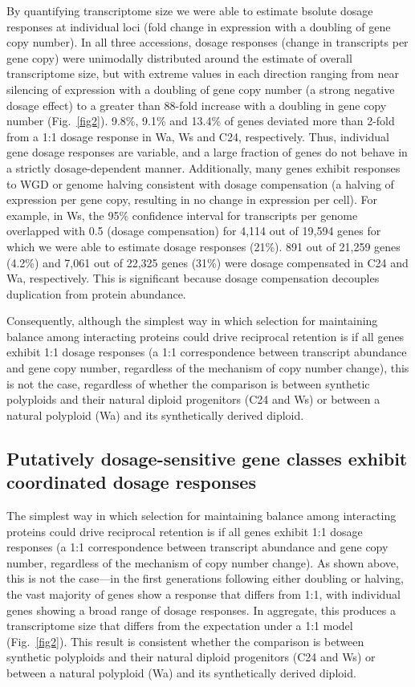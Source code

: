 \documentclass[11pt]{article}
\begin{document}
By quantifying transcriptome size we were able to estimate bsolute dosage responses at individual loci (fold change in expression with a doubling of gene copy number). In all three accessions, dosage responses (change in transcripts per gene copy) were unimodally distributed around the estimate of overall transcriptome size, but with extreme values in each direction ranging from near silencing of expression with a doubling of gene copy number (a strong negative dosage effect) to a greater than 88-fold increase with a doubling in gene copy number (Fig.~\ref{fig2}). 9.8\%, 9.1\% and 13.4\% of genes deviated more than 2-fold from a 1:1 dosage response in Wa, Ws and C24, respectively. Thus, individual gene dosage responses are variable, and a large fraction of genes do not behave in a strictly dosage-dependent manner.  
Additionally, many genes exhibit responses to WGD or genome halving consistent with dosage compensation (a halving of expression per gene copy, resulting in no change in expression per cell). For example, in Ws, the 95\% confidence interval for transcripts per genome overlapped with 0.5 (dosage compensation) for 4,114 out of 19,594 genes for which we were able to estimate dosage responses (21\%). 891 out of 21,259 genes (4.2\%) and 7,061 out of 22,325 genes (31\%) were dosage compensated in C24 and Wa, respectively. This is significant because dosage compensation decouples duplication from protein abundance.
	
Consequently, although the simplest way in which selection for maintaining balance among interacting proteins could drive reciprocal retention is if all genes exhibit 1:1 dosage responses (a 1:1 correspondence between transcript abundance and gene copy number, regardless of the mechanism of copy number change), this is not the case, regardless of whether the comparison is between synthetic polyploids and their natural diploid progenitors (C24 and Ws) or between a natural polyploid (Wa) and its synthetically derived diploid.

\subsection*{Putatively dosage-sensitive gene classes exhibit coordinated dosage responses}

The simplest way in which selection for maintaining balance among interacting proteins could drive reciprocal retention is if all genes exhibit 1:1 dosage responses (a 1:1 correspondence between transcript abundance and gene copy number, regardless of the mechanism of copy number change). As shown above, this is not the case---in the first generations following either doubling or halving, the vast majority of genes show a response that differs from 1:1, with individual genes showing a broad range of dosage responses. In aggregate, this produces a transcriptome size that differs from the expectation under a 1:1 model (Fig.~\ref{fig2}). This result is consistent whether the comparison is between synthetic polyploids and their natural diploid progenitors (C24 and Ws)  or between a natural polyploid (Wa) and its synthetically derived diploid.
\end{document}
